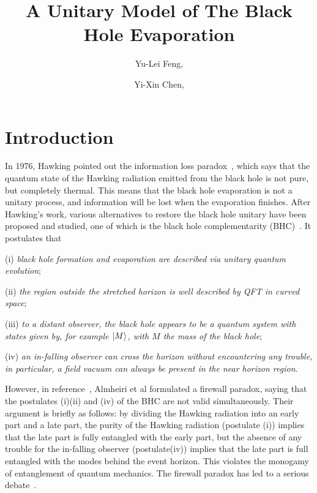 \documentclass[12pt,a4paper]{article}
\title{A Unitary Model of The Black Hole Evaporation}
\author[a]{Yu-Lei Feng,}
\author[a,1]{Yi-Xin Chen,\note{Corresponding author.}}
\affiliation[a]{Zhejiang Institute of Modern Physics, Zhejiang University,\\
Hangzhou, 310027, P. R. China}
\begin{document}
\maketitle

\newpage
\section{Introduction}
\label{sec:intro}

In 1976, Hawking pointed out the information loss paradox~\cite{a,b}, which says that the quantum state of the Hawking radiation emitted
from the black hole is not pure, but completely thermal. This means that the black
hole evaporation is not a unitary process, and information will be lost when the evaporation finishes. After Hawking's
work, various alternatives to restore the black hole unitary have
been proposed and studied, one of which is the black hole
complementarity (BHC)~\cite{c}. It postulates that

(i) \emph{black hole formation and evaporation are described via unitary
quantum evolution};

(ii) \emph{the region outside the stretched horizon is well described by
QFT in curved space};

(iii) \emph{to a distant observer, the black hole appears to be a quantum system with states given by, for example $\arrowvert
M\rangle$, with $M$ the mass of the black hole};

(iv) \emph{an in-falling observer can cross the horizon without
encountering any trouble, in particular, a field
vacuum can always be present in the near horizon region}.

However, in reference~\cite{d}, Almheiri et al formulated a
firewall paradox, saying that the postulates (i)(ii) and (iv) of the BHC are
not valid simultaneously. Their argument is briefly as follows: by dividing the Hawking radiation into an early part and
a late part, the purity of the Hawking radiation (postulate (i))
implies that the late part is fully entangled with the early
part, but the absence of any trouble for the in-falling
observer (postulate(iv)) implies that the late part is full entangled with the
modes behind the event horizon. This violates the monogamy of entanglement
of quantum mechanics. The firewall paradox has led to a serious
debate~\cite{d,e,f,g,h}.
\end{document}
